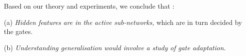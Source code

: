 Based on our theory and experiments, we conclude that :

(a) \emph{Hidden features are in the active sub-networks,} which are in turn decided by the gates.

(b) \emph{Understanding generalisation would involve a study of gate adaptation.}



\begin{comment}
Let $\gamma>0$ be a threshold value, and let $G_{x_s,\Tg_t}(l,i)$ denote the gating value node $i$ in layer $l$. We say that the gate to be \emph{transitioning} for input $s\in[n]$, and weight $\tg(m),m\in[d_{net}]$ if
 \begin{align}
 \left|\frac{\partial G_{x_s,\Tg_t}(l,i)}{\partial \tg(m)}\right|>\gamma,
 \end{align}
 and define a gate to be \emph{flipped} otherwise. Note that,
\begin{align}\label{eq:sensitivepath}
\begin{split}
&\partial_{m}A_{\Tg_t}(x_s,p)=\partial_{m}\Pi_{l=1}^{d-1} G_{x_s,\Tg_t}(l,p(l))\\
&=\sum_{l=1}^{d-1} \partial_{m} G_{x_s,\Tg_t}(l,p(l)) \left(\Pi_{l'\neq l} G_{x_s,\Tg_t}(l',p(l'))\right)
\end{split}
\end{align}

\textbf{Remark:}

i) As $\beta\uparrow\infty$, the soft-ReLU gate resembles the ReLU gate. Thus for a given input example $s$, the gates whose pre-activation inputs have a large absolute value will be close to either $0$ or $1$, and one can always find a high enough $\beta$ such that their sensitivity to $\tg(m)$ is less than $\gamma$.

ii) For an input examples $s,s'\in[n]$, if a path $p$ is active (even for one of the inputs), i.e., $A(x_s,p)\approx 1$, then none of the gates in the path will be sensitive, and hence the magnitude contribution of such as path to the summation in $\delta$ is close to $0$.

iii) For an input examples $s,s'\in[n]$, consider a non-active path, such that all gates close to $1$ except for one of the gates (i.e., the right hand side of \eqref{eq:sensitivepath} is non-zero), which is transitioning. Such paths will make a significant contribution to $\delta$ term. We call the set of such paths the sensitive sub-network.

Based on the above discussion one can say  that a DGN with adaptable gates (which includes standard DNN with ReLU gates), at initialisation, has two kinds of sub-networks for every input example i) the active sub-network comprised of path for which $A(x_s,p)=1$\footnote{or $A(x_s,p)$  is above a given threshold value in the case of soft gates} and ii) the sensitive sub-network which is formed by the set of paths that are sensitive for a given input.
\end{comment}